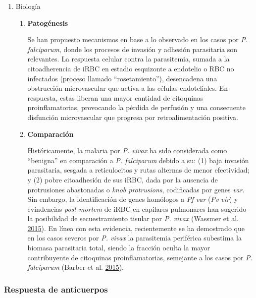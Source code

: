 \documentclass[
  a4paper]{article}
\begin{document}
\begin{enumerate}
\def\labelenumi{\alph{enumi}.}
\setcounter{enumi}{2}
\item
  Biología

  \begin{enumerate}
  \def\labelenumii{\roman{enumii}.}
  \item
    \textbf{Patogénesis}

    Se han propuesto mecanismos en base a lo observado en los casos por
    \emph{P. falciparum}, donde los procesos de invasión y adhesión
    parasitaria son relevantes. La respuesta celular contra la
    parasitemia, sumada a la citoadherencia de iRBC en estadio
    esquizonte a endotelio o RBC no infectados (proceso llamado
    ``rosetamiento''), desencadena una obstrucción microvascular que
    activa a las células endoteliales. En respuesta, estas liberan una
    mayor cantidad de citoquinas proinflamatorias, provocando la pérdida
    de perfusión y una consecuente disfunción microvascular que progresa
    por retroalimentación positiva.
  \item
    \textbf{Comparación}

    Históricamente, la malaria por \emph{P. vivax} ha sido considerada
    como ``benigna'' en comparación a \emph{P. falciparum} debido a su:
    (1) baja invasión parasitaria, sesgada a reticulocitos y rutas
    alternas de menor efectividad; y (2) pobre citoadhesión de sus iRBC,
    dada por la ausencia de protrusiones abastonadas o \emph{knob
    protrusions}, codificadas por genes \emph{var}. Sin embargo, la
    identificación de genes homólogos a \emph{Pf var} (\emph{Pv vir}) y
    evindencias \emph{post mortem} de iRBC en capilares pulmonares han
    sugerido la posibilidad de secuestramiento tisular por \emph{P.
    vivax} (Wassmer et al. \protect\hyperlink{ref-wassmer2015}{2015}).
    En línea con esta evidencia, recientemente se ha demostrado que en
    los casos severos por \emph{P. vivax} la parasitemia periférica
    subestima la biomasa parasitaria total, siendo la fracción oculta la
    mayor contribuyente de citoquinas proinflamatorias, semejante a los
    casos por \emph{P. falciparum} (Barber et al.
    \protect\hyperlink{ref-barber2015}{2015}). 
  \end{enumerate}
\end{enumerate}

\hypertarget{respuesta-de-anticuerpos}{%
\subsubsection{Respuesta de
anticuerpos}\label{respuesta-de-anticuerpos}}
\end{document}
